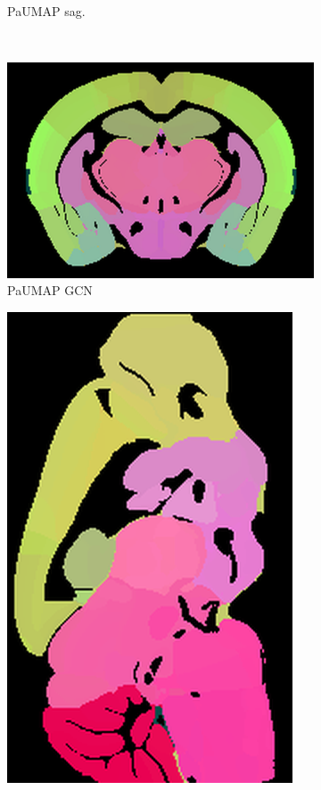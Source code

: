\documentclass[]{article}
\begin{document}
\begin{figure}
\begin{subfigure}{.176\textwidth}
		\caption{PaUMAP sag.}
		\label{fig:ParaUMAP_sag}
	\end{subfigure}\\

	\begin{subfigure}{.25\textwidth}
		\centering
		\includegraphics[width=.9\linewidth]{../results/para_umap_GCN_ano_coronal_50_res_slice_1.png}
		\caption{PaUMAP GCN}
		\label{fig:ParaUMAP_GCN_cor}
	\end{subfigure}
	\begin{subfigure}{.176\textwidth}
		\centering
		\includegraphics[width=.9\linewidth, angle=270]{../results/para_umap_GCN_ano_sagittal_50_res_slice_1.png}

\end{subfigure}
\end{figure}
\end{document}
